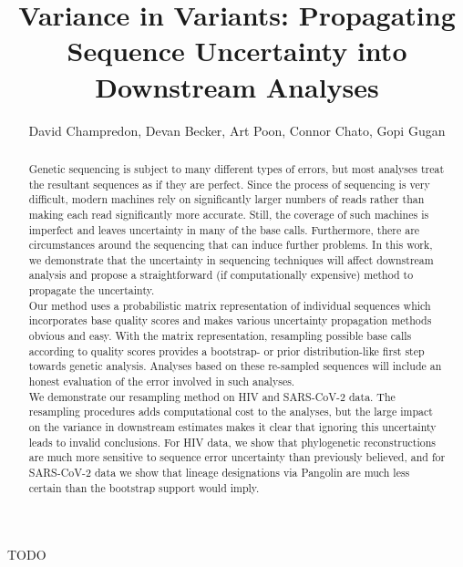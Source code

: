 \documentclass[
]{article}
\title{Variance in Variants: Propagating Sequence Uncertainty into
Downstream Analyses}
\author{David Champredon, Devan Becker, Art Poon, Connor Chato, Gopi
Gugan}
\date{}
\begin{document}
\maketitle
\begin{abstract}
Genetic sequencing is subject to many different types of errors, but
most analyses treat the resultant sequences as if they are perfect.
Since the process of sequencing is very difficult, modern machines rely
on significantly larger numbers of reads rather than making each read
significantly more accurate. Still, the coverage of such machines is
imperfect and leaves uncertainty in many of the base calls. Furthermore,
there are circumstances around the sequencing that can induce further
problems. In this work, we demonstrate that the uncertainty in
sequencing techniques will affect downstream analysis and propose a
straightforward (if computationally expensive) method to propagate the
uncertainty.\\
Our method uses a probabilistic matrix representation of individual
sequences which incorporates base quality scores and makes various
uncertainty propagation methods obvious and easy. With the matrix
representation, resampling possible base calls according to quality
scores provides a bootstrap- or prior distribution-like first step
towards genetic analysis. Analyses based on these re-sampled sequences
will include an honest evaluation of the error involved in such
analyses.\\
We demonstrate our resampling method on HIV and SARS-CoV-2 data. The
resampling procedures adds computational cost to the analyses, but the
large impact on the variance in downstream estimates makes it clear that
ignoring this uncertainty leads to invalid conclusions. For HIV data, we
show that phylogenetic reconstructions are much more sensitive to
sequence error uncertainty than previously believed, and for SARS-CoV-2
data we show that lineage designations via Pangolin are much less
certain than the bootstrap support would imply.
\end{abstract}

TODO
\end{document}
